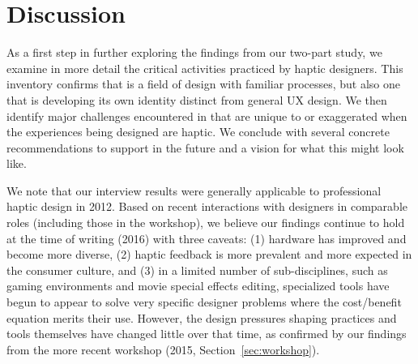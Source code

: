 %
%
\section {Discussion}
\label{sec:discussion}
\noindent
%
As a first step in further exploring the findings from our two-part study, 
we examine in more detail the critical activities practiced by haptic designers.
This inventory confirms that \haxd is a field of design with familiar processes, but also one that is developing its own identity distinct from general UX design.
We then identify major challenges encountered in \haxd that are unique to or exaggerated when the experiences being designed are haptic. %
We conclude with several concrete recommendations to support \haxd in the future and a vision for what this might look like.

We note that our interview results were generally applicable to professional haptic design in 2012.
Based on recent interactions with designers in comparable roles (including %
those in the workshop), we believe our findings continue to hold at the time of writing (2016) with three caveats: (1) hardware has improved and become more diverse, (2) haptic feedback is more prevalent and more expected in the consumer culture, and (3) in a limited number of sub-disciplines, such as gaming environments and movie special effects editing, specialized tools have begun to appear to solve very specific designer problems where the cost/benefit equation merits their use. 
However, the design pressures shaping practices and tools themselves have changed little over that time, as confirmed by our findings from the more recent workshop (2015, Section~\ref{sec:workshop}).



